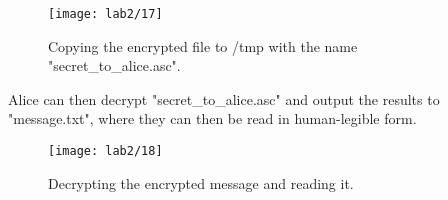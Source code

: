\begin{figure}[H]
    \centering
    \texttt{[image: lab2/17]}
    \caption{Copying the encrypted file to /tmp with the name "secret_to_alice.asc".}
    \label{fig:copyLab2Msg}
\end{figure}

Alice can then decrypt "secret\_to\_alice.asc" and output the results to "message.txt", where they can then
be read in human-legible form.

\begin{figure}[H]
    \centering
    \texttt{[image: lab2/18]}
    \caption{Decrypting the encrypted message and reading it.}
    \label{fig:decryptLab2Msg}
\end{figure}
